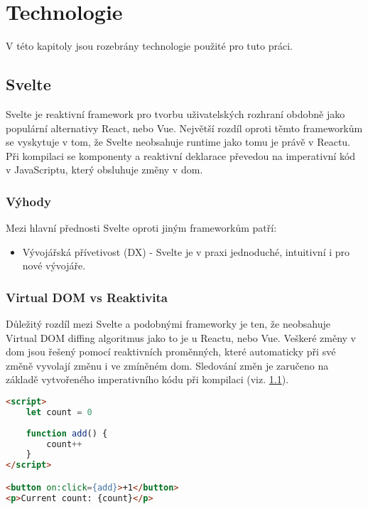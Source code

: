 \chapter{Technologie}

V této kapitoly jsou rozebrány technologie použité pro tuto práci.

\section{Svelte}\label{sec:Svelte}

Svelte je reaktivní framework pro tvorbu uživatelských rozhraní obdobně jako populární alternativy React, nebo Vue.
Největší rozdíl oproti těmto frameworkům se vyskytuje v tom, že Svelte neobsahuje runtime jako tomu je právě v Reactu.
Při kompilaci se komponenty a reaktivní deklarace převedou na imperativní kód v JavaScriptu, který obsluhuje změny v \gls{dom}.

\subsection{Výhody}

Mezi hlavní přednosti Svelte oproti jiným frameworkům patří:

\begin{itemize}
    \item Vývojářská přívetivost (DX) - Svelte je v praxi jednoduché, intuitivní i pro nové vývojáře.
\end{itemize}

\clearpage

\subsection{Virtual DOM vs Reaktivita}

Důležitý rozdíl mezi Svelte a podobnými frameworky je ten, že neobsahuje Virtual DOM diffing algoritmus jako to je u Reactu, nebo Vue.
Veškeré změny v \gls{dom} jsou řešený pomocí reaktivních proměnných, které automaticky při své změně vyvolají změnu i ve zmíněném \gls{dom}.
Sledování změn je zaručeno na základě vytvořeného imperativního kódu při kompilaci (viz. \ref{sec:Svelte}).

\begin{lstlisting}[caption={Počítadlo ve Svelte}, label={svelte-counter}, language=html]
<script>
	let count = 0
	
	function add() {
		count++
	}
</script>

<button on:click={add}>+1</button>
<p>Current count: {count}</p>
\end{lstlisting}

